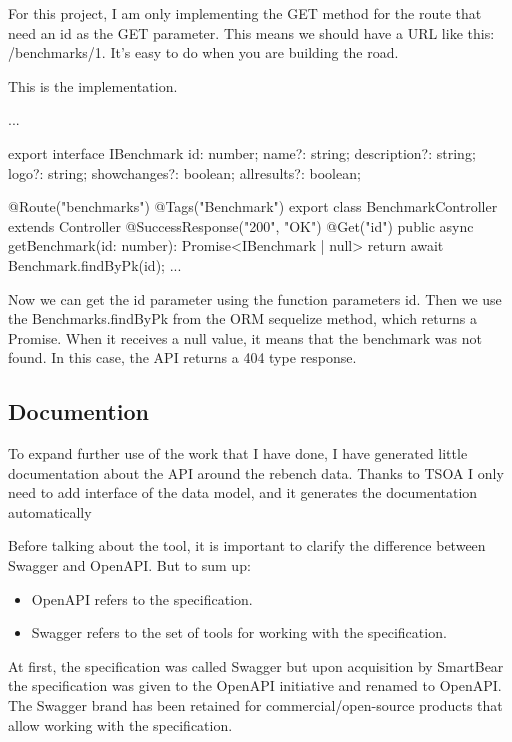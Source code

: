 \documentclass{article}
\begin{document}
For this project, I am only implementing the GET method for the route that need an id as the GET parameter. This means we should have a URL like this: /benchmarks/1. It's easy to do when you are building the road.

This is the implementation.

\begin{python}
...

export interface IBenchmark {
  id: number;
  name?: string;
  description?: string;
  logo?: string;
  showchanges?: boolean;
  allresults?: boolean;
}

@Route("benchmarks")
@Tags("Benchmark")
export class BenchmarkController extends Controller {
  @SuccessResponse("200", "OK")
  @Get("{id}")
  public async getBenchmark(id: number): Promise<IBenchmark | null> {
    return await Benchmark.findByPk(id);
  }
  ...
}
\end{python}

Now we can get the id parameter using the function parameters id. Then we use the Benchmarks.findByPk from the ORM sequelize method, which returns a Promise. When it receives a null value, it means that the benchmark was not found. In this case, the API returns a 404 type response.

\subsection{Documention}

To expand further use of the work that I have done, I have generated little documentation about the API around the rebench data.
Thanks to TSOA I only need to add interface of the data model, and it generates the documentation automatically

Before talking about the tool, it is important to clarify the difference between Swagger and OpenAPI. But to sum up:

\begin{itemize}
    \item OpenAPI refers to the specification.
    \item Swagger refers to the set of tools for working with the specification.
\end{itemize}

At first, the specification was called Swagger but upon acquisition by SmartBear the specification was given to the OpenAPI initiative and renamed to OpenAPI. The Swagger brand has been retained for commercial/open-source products that allow working with the specification.
\end{document}
